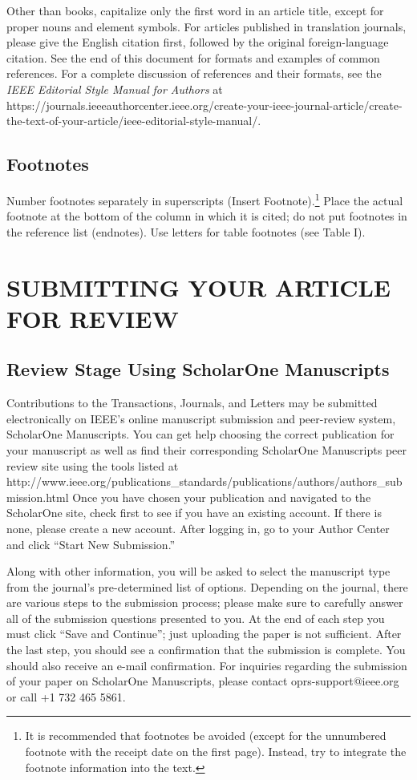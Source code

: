 \documentclass{IEEEtaes}
\begin{document}
Other than books, capitalize only the first word in an article title, except for proper nouns and element symbols. For articles published in translation journals, please give the English citation first, followed by the original foreign-language citation. See the end of this document for formats and examples of common references. For a complete discussion of references and their formats, see the \emph{IEEE Editorial Style Manual} \emph{for Authors} at {{https://journals.ieeeauthorcenter.ieee.org/create-your-ieee-journal-article/create-the-text-of-your-article/ieee-editorial-style-manual/}}.

\subsection{Footnotes}

Number footnotes separately in superscripts (Insert \textbar{}Footnote).\footnote{It is recommended that footnotes be avoided (except for the unnumbered footnote with the receipt date on the first page). Instead, try to integrate the footnote information into the text.} Place the actual footnote at the bottom of the column in which it is cited; do not put footnotes in the reference list (endnotes). Use letters for table footnotes (see Table I).

\section{SUBMITTING YOUR ARTICLE FOR REVIEW}

\subsection{Review Stage Using ScholarOne Manuscripts}

Contributions to the Transactions, Journals, and Letters may be submitted electronically on IEEE's online manuscript submission and peer-review system, ScholarOne Manuscripts. You can get help choosing the correct publication for your manuscript as well as find their corresponding ScholarOne Manuscripts peer review site using the tools listed at {{http://www.ieee.org/publications\_standards/\break publications/authors/authors\_submission.html}} Once you have chosen your publication and navigated to the ScholarOne site, check first to see if you have an existing account. If there is none, please create a new account. After logging in, go to your Author Center and click ``Start New Submission.''

Along with other information, you will be asked to select the manuscript type from the journal's pre-determined list of options. Depending on the journal, there are various steps to the submission process; please make sure to carefully answer all of the submission questions presented to you. At the end of each step you must click ``Save and Continue''; just uploading the paper is not sufficient. After the last step, you should see a confirmation that the submission is complete. You should also receive an e-mail confirmation. For inquiries regarding the submission of your paper on ScholarOne Manuscripts, please contact oprs-support@ieee.org or call +1 732 465 5861.
\end{document}
